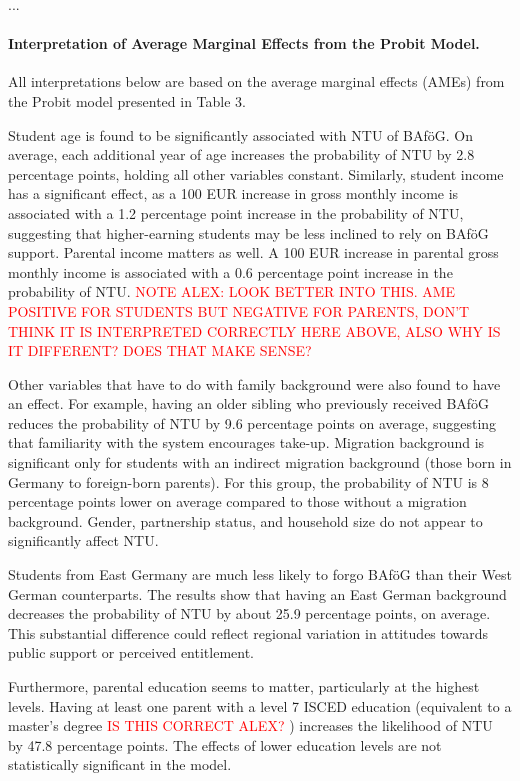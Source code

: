 ...

\paragraph{Interpretation of Average Marginal Effects from the Probit Model.} All interpretations below are based on the average marginal effects (AMEs) from the Probit model presented in Table 3.

Student age is found to be significantly associated with NTU of BAföG. On average, each additional year of age increases the probability of NTU by 2.8 percentage points, holding all other variables constant. Similarly, student income has a significant effect, as a 100 EUR increase in gross monthly income is associated with a 1.2 percentage point increase in the probability of NTU, suggesting that higher-earning students may be less inclined to rely on BAföG support. Parental income matters as well. A 100 EUR increase in parental gross monthly income is associated with a 0.6 percentage point increase in the probability of NTU. \textcolor{red}{NOTE ALEX: LOOK BETTER INTO THIS. AME POSITIVE FOR STUDENTS BUT NEGATIVE FOR PARENTS, DON’T THINK IT IS INTERPRETED CORRECTLY HERE ABOVE, ALSO WHY IS IT DIFFERENT? DOES THAT MAKE SENSE?}

Other variables that have to do with family background were also found to have an effect. For example, having an older sibling who previously received BAföG reduces the probability of NTU by 9.6 percentage points on average, suggesting that familiarity with the system encourages take-up. Migration background is significant only for students with an indirect migration background (those born in Germany to foreign-born parents). For this group, the probability of NTU is 8 percentage points lower on average compared to those without a migration background.  Gender, partnership status, and household size do not appear to significantly affect NTU.

Students from East Germany are much less likely to forgo BAföG than their West German counterparts. The results show that having an East German background decreases the probability of NTU by about 25.9 percentage points, on average. This substantial difference could reflect regional variation in attitudes towards public support or perceived entitlement.

Furthermore, parental education seems to matter, particularly at the highest levels. Having at least one parent with a level 7 ISCED education (equivalent to a master’s degree \textcolor{red}{IS THIS CORRECT ALEX?}
) increases the likelihood of NTU by 47.8 percentage points. The effects of lower education levels are not statistically significant in the model.

